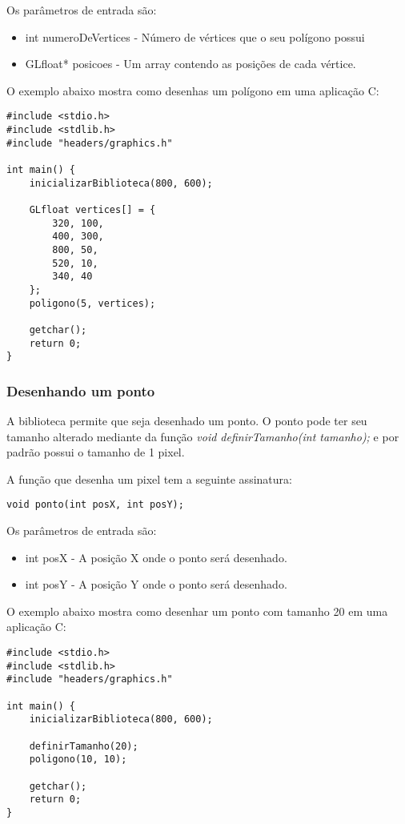 \documentclass[12pt, %
openright,
oneside, %
a4paper,    %
brazil]{facom-ufu-abntex2}
\begin{document}
Os parâmetros de entrada são:

\begin{itemize}
    \item int numeroDeVertices - Número de vértices que o seu polígono possui
    \item GLfloat* posicoes - Um array contendo as posições de cada vértice.
\end{itemize}

O exemplo abaixo mostra como desenhas um polígono em uma aplicação C:

\begin{lstlisting}
#include <stdio.h>
#include <stdlib.h>
#include "headers/graphics.h"

int main() {
    inicializarBiblioteca(800, 600);

    GLfloat vertices[] = {
        320, 100,
        400, 300,
        800, 50,
        520, 10,
        340, 40
    };
    poligono(5, vertices);

    getchar();
    return 0;
}
\end{lstlisting}

\subsubsection{Desenhando um ponto}
A biblioteca permite que seja desenhado um ponto. O ponto pode ter seu tamanho alterado mediante da função \textit{void definirTamanho(int tamanho);} e por padrão possui o tamanho de 1 pixel.

A função que desenha um pixel tem a seguinte assinatura:

\begin{lstlisting}
void ponto(int posX, int posY);
\end{lstlisting}

Os parâmetros de entrada são:

\begin{itemize}
    \item int posX - A posição X onde o ponto será desenhado.
    \item int posY - A posição Y onde o ponto será desenhado.
\end{itemize}

O exemplo abaixo mostra como desenhar um ponto com tamanho 20 em uma aplicação C:

\begin{lstlisting}
#include <stdio.h>
#include <stdlib.h>
#include "headers/graphics.h"

int main() {
    inicializarBiblioteca(800, 600);

    definirTamanho(20);
    poligono(10, 10);

    getchar();
    return 0;
}
\end{lstlisting}
\end{document}
